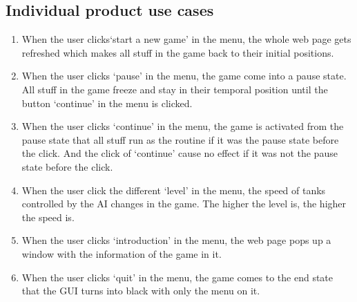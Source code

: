 \documentclass{article}
\begin{document}
\subsection {Individual product use cases}
\begin{enumerate}
\item When the user clicks`start a new game' in the menu, the whole web page gets
 refreshed which makes all stuff in the game back to their initial positions.

\item When the user clicks `pause' in the menu, the game come into a pause state.
 All stuff in the game freeze and stay in their temporal position until the 
 button `continue' in the menu is clicked.

\item When the user clicks `continue' in the menu, the game is activated from 
the pause state that all stuff run as the routine if it was the pause state 
before the click. And the click of  `continue' cause no effect if it was not the 
pause state before the click.

\item When the user click the different `level' in the menu, the speed of tanks 
controlled by the AI changes in the game. The higher the level is, the higher 
the speed is.

\item When the user clicks `introduction' in the menu, the web page pops up a 
window with the information of the game in it.

\item When the user clicks `quit' in the menu, the game comes to the end state 
that the GUI turns into black with only the menu on it.


\end{enumerate}
\end{document}
